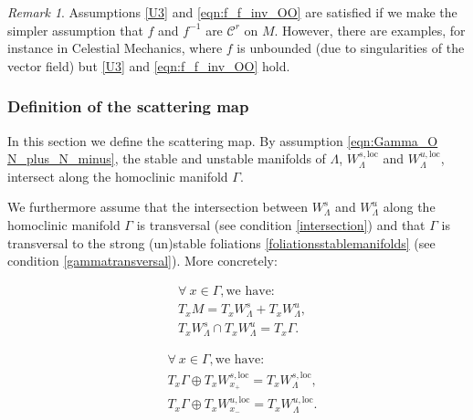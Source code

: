 \documentclass[11pt]{amsart}
\theoremstyle{definition}
\theoremstyle{remark}
\newtheorem{rem}[thm]{Remark}
\numberwithin{equation}{section}
\newcommand{\C}{\mathcal{C}}
\begin{document}
\begin{rem}
Assumptions \eqref{U3} and \eqref{eqn:f_f_inv_OO} are satisfied if we make the simpler assumption that $f$  and $f^{-1}$ are $\C^r$ on $M$.
However, there are examples, for instance in Celestial Mechanics, where $f$ is unbounded (due to singularities of the vector field) but \eqref{U3} and \eqref{eqn:f_f_inv_OO}  hold.
\end{rem}






\subsubsection{Definition of the scattering map}
In this section we define the scattering map. By  assumption \eqref{eqn:Gamma_O N_plus_N_minus},
the stable and unstable manifolds of $\Lambda$, $W_\Lambda^{s,\textrm{loc}}$ and  $W_\Lambda^{u,\textrm{loc}}$, intersect  along the homoclinic manifold $\Gamma$.

We furthermore assume that the intersection between $W_\Lambda^{s}$ and  $W_\Lambda^{u}$  along the homoclinic manifold $\Gamma$ is transversal (see condition \eqref{intersection}) and that $\Gamma$ is transversal to the strong (un)stable foliations \eqref{foliationsstablemanifolds} (see condition
\eqref{gammatransversal}).
More concretely:



\begin{equation}\label{intersection}
  \begin{split}
    & \forall\ x\in\Gamma, \textrm{we have:} \\
&T_x M = T_x W_\Lambda^{s } + T_x W_\Lambda^{u },\\
&T_x W_\Lambda^{s } \cap T_x W_\Lambda^{u} = T_x \Gamma.
\end{split}
\end{equation}



\begin{equation}\label{gammatransversal}
\begin{split}
  & \forall\ x\in\Gamma, \textrm{we have:} \\
&T_x \Gamma \oplus T_x W_{x_+}^{s,\textrm{loc}} = T_x W_\Lambda^{s,\textrm{loc}},\\
&T_x \Gamma \oplus T_x W_{x_-}^{u,\textrm{loc}} = T_x W_\Lambda^{u,\textrm{loc}}.
\end{split}
\end{equation}
\end{document}
